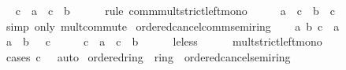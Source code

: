 \begin{isabellebody}
\ \isamarkupfalse%
\ {\isachardoublequoteopen}c\ {\isacharasterisk}{\kern0pt}\ a\ {\isacharless}{\kern0pt}\ c\ {\isacharasterisk}{\kern0pt}\ b{\isachardoublequoteclose}\isanewline
\ \ \ \ \isamarkupfalse%
\ {\isacharparenleft}{\kern0pt}rule\ comm{\isacharunderscore}{\kern0pt}mult{\isacharunderscore}{\kern0pt}strict{\isacharunderscore}{\kern0pt}left{\isacharunderscore}{\kern0pt}mono{\isacharparenright}{\kern0pt}\isanewline
\ \ \isamarkupfalse%
\ \isamarkupfalse%
\ {\isachardoublequoteopen}a\ {\isacharasterisk}{\kern0pt}\ c\ {\isacharless}{\kern0pt}\ b\ {\isacharasterisk}{\kern0pt}\ c{\isachardoublequoteclose}\isanewline
\ \ \ \ \isamarkupfalse%
\ {\isacharparenleft}{\kern0pt}simp\ only{\isacharcolon}{\kern0pt}\ mult{\isachardot}{\kern0pt}commute{\isacharparenright}{\kern0pt}\isanewline
{}\isamarkupfalse%
%
\endisatagproof
{\isafoldproof}%
%
\isadelimproof
\isanewline
%
\endisadelimproof
\isanewline
{}\isamarkupfalse%
\ ordered{\isacharunderscore}{\kern0pt}cancel{\isacharunderscore}{\kern0pt}comm{\isacharunderscore}{\kern0pt}semiring\isanewline
%
\isadelimproof
%
\endisadelimproof
%
\isatagproof
{}\isamarkupfalse%
\isanewline
\ \ \isamarkupfalse%
\ a\ b\ c\ {\isacharcolon}{\kern0pt}{\isacharcolon}{\kern0pt}\ {\isacharprime}{\kern0pt}a\isanewline
\ \ \isamarkupfalse%
\ {\isachardoublequoteopen}a\ {\isasymle}\ b{\isachardoublequoteclose}\ {\isachardoublequoteopen}{}\ {\isasymle}\ c{\isachardoublequoteclose}\isanewline
\ \ \isamarkupfalse%
\ \isamarkupfalse%
\ {\isachardoublequoteopen}c\ {\isacharasterisk}{\kern0pt}\ a\ {\isasymle}\ c\ {\isacharasterisk}{\kern0pt}\ b{\isachardoublequoteclose}\isanewline
\ \ \ \ \isamarkupfalse%
\ le{\isacharunderscore}{\kern0pt}less\isanewline
\ \ \ \ \isamarkupfalse%
\ mult{\isacharunderscore}{\kern0pt}strict{\isacharunderscore}{\kern0pt}left{\isacharunderscore}{\kern0pt}mono\ \isamarkupfalse%
\ {\isacharparenleft}{\kern0pt}cases\ {\isachardoublequoteopen}c\ {\isacharequal}{\kern0pt}\ {}{\isachardoublequoteclose}{\isacharparenright}{\kern0pt}\ auto\isanewline
{}\isamarkupfalse%
%
\endisatagproof
{\isafoldproof}%
%
\isadelimproof
\isanewline
%
\endisadelimproof
\isanewline
{}\isamarkupfalse%
\isanewline
\isanewline
{}\isamarkupfalse%
\ ordered{\isacharunderscore}{\kern0pt}ring\ {\isacharequal}{\kern0pt}\ ring\ {\isacharplus}{\kern0pt}\ ordered{\isacharunderscore}{\kern0pt}cancel{\isacharunderscore}{\kern0pt}semiring\isanewline

\end{isabellebody}
